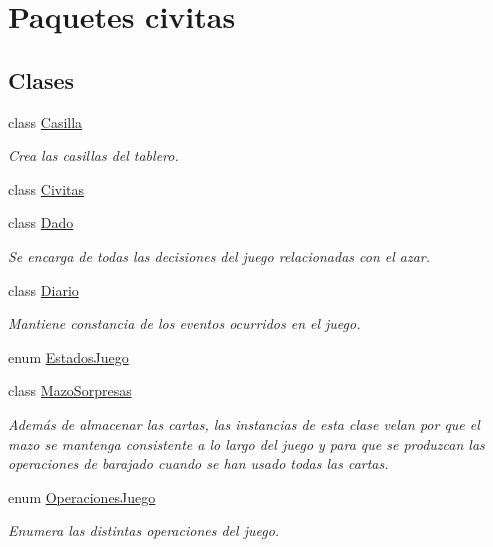 \hypertarget{namespacecivitas}{}\section{Paquetes civitas}
\label{namespacecivitas}
\subsection*{Clases}
\begin{DoxyCompactItemize}
\item 
class \hyperlink{classcivitas_1_1Casilla}{Casilla}
\begin{DoxyCompactList}\small\item\em Crea las casillas del tablero. \end{DoxyCompactList}\item 
class \hyperlink{classcivitas_1_1Civitas}{Civitas}
\item 
class \hyperlink{classcivitas_1_1Dado}{Dado}
\begin{DoxyCompactList}\small\item\em Se encarga de todas las decisiones del juego relacionadas con el azar. \end{DoxyCompactList}\item 
class \hyperlink{classcivitas_1_1Diario}{Diario}
\begin{DoxyCompactList}\small\item\em Mantiene constancia de los eventos ocurridos en el juego. \end{DoxyCompactList}\item 
enum \hyperlink{enumcivitas_1_1EstadosJuego}{Estados\+Juego}
\item 
class \hyperlink{classcivitas_1_1MazoSorpresas}{Mazo\+Sorpresas}
\begin{DoxyCompactList}\small\item\em Además de almacenar las cartas, las instancias de esta clase velan por que el mazo se mantenga consistente a lo largo del juego y para que se produzcan las operaciones de barajado cuando se han usado todas las cartas. \end{DoxyCompactList}\item 
enum \hyperlink{enumcivitas_1_1OperacionesJuego}{Operaciones\+Juego}
\begin{DoxyCompactList}\small\item\em Enumera las distintas operaciones del juego. \end{DoxyCompactList}\item 

\end{DoxyCompactItemize}
